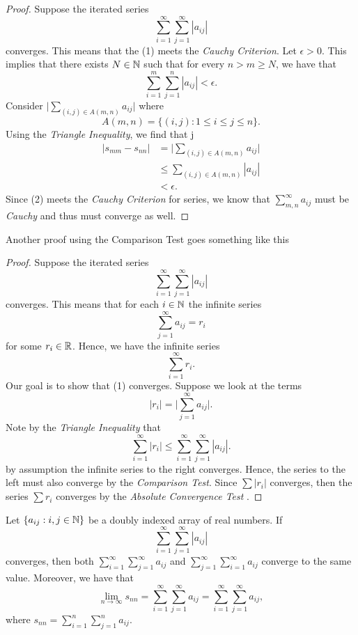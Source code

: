 \begin{proof}
Suppose the iterated series 
\[ \sum_{i=1}^{\infty} \sum_{j=1}^{\infty} |a_{ij}|  \tag{1}\]
converges. This means that the (1) meets the \textit{Cauchy Criterion}. Let \(\epsilon > 0 \). This implies that there exists \( N \in \mathbb{N} \) such that for every \( n > m  \geq N \), we have that 
\[ \sum_{i= 1}^{m} \sum_{j= 1}^{n} |a_{ij}| < \epsilon.\]
Consider \( \Big| \sum_{(i,j) \in A(m,n)} a_{ij} \Big|\) where 
\[  A(m,n) = \{ (i,j) : 1 \leq i \leq j \leq n \}.  \] Using the \textit{Triangle Inequality}, we find that  
j\begin{align*}
    \Big| s_{m m} - s_{nn} \Big| &= \Big| \sum_{ (i,j) \in A(m,n)} a_{ij} \Big| \\ 
                                 &\leq \sum_{(i,j) \in A(m,n)} | a_{ij} | \tag{2}\\                          &< \epsilon.
\end{align*}
Since (2) meets the \textit{Cauchy Criterion} for series, we know that \( \sum_{ m,n }^{ \infty  } a_{ij} \) must be \textit{Cauchy} and thus must converge as well. 
\end{proof}

Another proof using the Comparison Test goes something like this

\begin{proof}
    Suppose the iterated series 
    \[ \sum_{i=1}^{\infty} \sum_{j=1}^{\infty} |a_{ij}| \]
    converges. This means that for each \( i \in \mathbb{N} \) the infinite series 
    \[ \sum_{j=1}^{\infty} a_{ij} = r_i \] for some \( r_i \in \mathbb{R} \). Hence, we have the infinite series 
    \[ \sum_{i=1}^{\infty} r_i. \tag{1} \]
    Our goal is to show that (1) converges. Suppose we look at the terms 
    \[ |r_i| = \Big| \sum_{j=1}^{\infty} a_{ij}\Big|.\]
    Note by the \textit{Triangle Inequality} that 
    \[ \sum_{i=1}^{\infty} |r_i| \leq \sum_{i=1}^{\infty} \sum_{j=1}^{\infty} |a_{ij}|.  \]
    by assumption the infinite series to the right converges. Hence, the series to the left must also converge by the \textit{Comparison Test}. Since \( \sum |r_i|\) converges, then the series 
    \( \sum r_i \) converges by the \textit{ Absolute Convergence Test }. 
\end{proof}

\begin{tcolorbox}
\begin{thm}
    Let \( \{ a_{ij} : i,j \in \mathbb{N}  \}\) be a doubly indexed array of real numbers. If 
    \[ \sum_{i=1}^{\infty} \sum_{j=1}^{\infty} |a_{ij}|\]
    converges, then both \( \sum_{i=1}^{\infty} \sum_{ j=1 }^{ \infty  }  a_{ij}\) and \( \sum_{j=1}^{\infty} \sum_{i=1}^{\infty} a_{ij} \) converge to the same value. Moreover, we have that 
    \[ \lim_{n \to \infty} s_{nn} = \sum_{i=1}^{\infty} \sum_{j=1}^{\infty} a_{ij} = \sum_{i=1}^{\infty} \sum_{j=1}^{\infty} a_{ij},\]
    where \( s_{nn} = \sum_{i=1}^{n} \sum_{j=1}^{n} a_{ij}\). 
\end{thm}
\end{tcolorbox}


